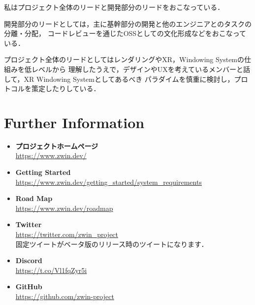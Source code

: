\documentclass[a4paper]{jsarticle}
\begin{document}
私はプロジェクト全体のリードと開発部分のリードをおこなっている．

開発部分のリードとしては，主に基幹部分の開発と他のエンジニアとのタスクの分離・分配，
コードレビューを通じたOSSとしての文化形成などをおこなっている．

プロジェクト全体のリードとしてはレンダリングやXR，Windowing Systemの仕組みを低レベルから
理解したうえで，デザインやUXを考えているメンバーと話して，XR Windowing Systemとしてあるべき
パラダイムを慎重に検討し，プロトコルを策定したりしている．

\section{Further Information}

\begin{itemize}
  \item \textbf{プロジェクトホームページ} \\
        \url{https://www.zwin.dev/}
  \item \textbf{Getting Started} \\
        \url{https://www.zwin.dev/getting_started/system_requirements}
  \item \textbf{Road Map} \\
        \url{https://www.zwin.dev/roadmap}
  \item \textbf{Twitter} \\
        \url{https://twitter.com/zwin_project} \\
        固定ツイートがベータ版のリリース時のツイートになります．
  \item \textbf{Discord} \\
        \url{https://t.co/Vl1fqZyr5i}
  \item \textbf{GitHub} \\
        \url{https://github.com/zwin-project}
\end{itemize}
\end{document}
